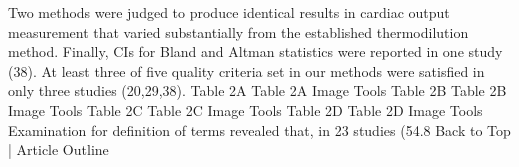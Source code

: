 \documentclass[MAIN.tex]{subfiles}
\begin{document}
	Two methods were judged to produce identical results in cardiac output measurement that varied substantially from the established thermodilution method. Finally, CIs for Bland and Altman statistics were reported in one study (38). At least three of five quality criteria set in our methods were satisfied in only three studies (20,29,38).
	Table 2A
	Table 2A
	Image Tools	Table 2B
	Table 2B
	Image Tools	Table 2C
	Table 2C
	Image Tools
	Table 2D
	Table 2D
	Image Tools
	Examination for definition of terms revealed that, in 23 studies (54.8%
	Back to Top | Article Outline
	
	\newpage
\end{document}

